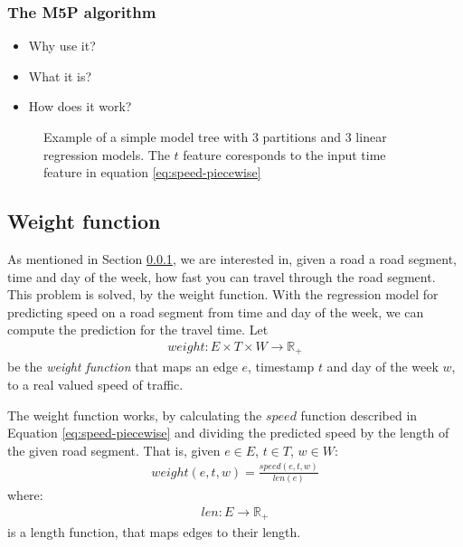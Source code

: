 \subsubsection{The M5P algorithm}
\begin{itemize}
\item Why use it?
\item What it is?
\item How does it work?
\end{itemize}
\begin{figure}
	\centering
	\caption{Example of a simple model tree with 3 partitions and 3 linear regression models. The $t$ feature coresponds to the input time feature in equation \ref{eq:speed-piecewise}}
\end{figure}
\subsection{Weight function}\label{sec:weight-function}
As mentioned in Section \ref{}, we are interested in, given a road a road segment, time and day of the week, how fast you can travel through the road segment. This problem is solved, by the weight function.
With the regression model for predicting speed on a road segment from time and day of the week, we can compute the prediction for the travel time. Let 
\begin{align}
weight: E \times T \times W \rightarrow \mathbb{R_+}
\end{align}
be the \emph{weight function} that maps an edge $e$, timestamp $t$ and day of the week $w$, to a real valued speed of traffic.

The weight function works, by calculating the $speed$ function described in Equation \ref{eq:speed-piecewise} and dividing the predicted speed by the length of the given road segment. That is, given $e \in E$, $t \in T$, $w \in W$:
\begin{align}
weight(e,t,w) = \frac{speed(e,t,w)}{len(e)}
\end{align}
where:
\begin{align}
len:E \rightarrow \mathbb{R_+}
\end{align}
is a length function, that maps edges to their length.